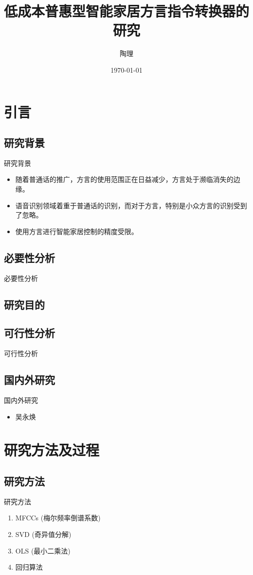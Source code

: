 \documentclass{beamer}
\title{低成本普惠型智能家居方言指令转换器的研究}
\author{陶理}
\date{\today}
\begin{document}
\maketitle
\section{引言}
\subsection{研究背景}
\begin{frame}{研究背景}
    \begin{itemize}
        \item 随着普通话的推广，方言的使用范围正在日益减少，方言处于濒临消失的边缘。
        \item 语音识别领域着重于普通话的识别，而对于方言，特别是小众方言的识别受到了忽略。
        \item 使用方言进行智能家居控制的精度受限。
    \end{itemize}
\end{frame}
\subsection{必要性分析}
\begin{frame}{必要性分析}
\end{frame}
\subsection{研究目的}
\subsection{可行性分析}
\begin{frame}{可行性分析}
\end{frame}
\subsection{国内外研究} 
\begin{frame}{国内外研究}
    \begin{itemize}
        \item 吴永焕\cite{WuYonghuan}
    \end{itemize}
\end{frame}
\section{研究方法及过程}
\subsection{研究方法}
\begin{frame}{研究方法}
    \begin{enumerate}
        \item MFCCs (梅尔频率倒谱系数)
        \item SVD (奇异值分解)
        \item OLS (最小二乘法)
        \item 回归算法
    \end{enumerate}
\end{frame}
\end{document}
